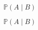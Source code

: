 \documentclass{article}
\begin{document}
	
	\[
	\mathbb{P}(A \mid B)
	\]
	
	\[
	\mathbb{P}(A \mid\! B)
	\]
	
	
\end{document}
